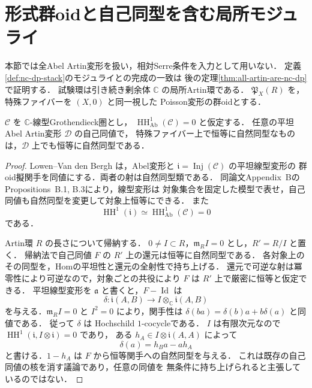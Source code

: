 \section{形式群oidと自己同型を含む局所モジュライ}
\label{sec:formal-groupoid}

本節では全Abel Artin変形を扱い，相対Serre条件を入力として用いない．
定義\ref{def:nc-dp-stack}のモジュライとの完成の一致は
後の定理\ref{thm:all-artin-are-nc-dp}で証明する．
試験環は引き続き剰余体 $\mathbb C$ の局所Artin環である．
$\mathfrak P_X(R)$ を，特殊ファイバーを $(X,0)$ と同一視した
Poisson変形の群oidとする．

\begin{lemma}[微小なAbel自己同値の消滅]
\label{lem:abel-infinitesimal-aut-rigidity}
$\mathcal C$ を $\mathbb C$-線型Grothendieck圏とし，
$\operatorname{HH}^1_{\mathrm{Ab}}(\mathcal C)=0$ と仮定する．
任意の平坦Abel Artin変形 $\mathcal D$ の自己同値で，
特殊ファイバー上で恒等に自然同型なものは，$\mathcal D$ 上でも恒等に自然同型である．
\end{lemma}
\begin{proof}
Lowen--Van den Bergh \cite[Definition~8.2, Theorem~8.17]{LowenVdBDeformation}
は，Abel変形と $\mathfrak i=\operatorname{Inj}(\mathcal C)$ の平坦線型変形の
群oid擬関手を同値にする．両者の射は自然同型類である．
同論文Appendix~BのPropositions~B.1, B.3により，線型変形は
対象集合を固定した模型で表せ，自己同値も自然同型を変更して対象上恒等にできる．
また
\[
 \operatorname{HH}^1(\mathfrak i)
 \simeq\operatorname{HH}^1_{\mathrm{Ab}}(\mathcal C)=0
\]
である\cite[Theorem~6.6]{LowenVdBHochschild}．

Artin環 $R$ の長さについて帰納する．
$0\ne I\subset R$，$\mathfrak m_RI=0$ とし，$R'=R/I$ と置く．
帰納法で自己同値 $F$ の $R'$ 上の還元は恒等に自然同型である．
各対象上のその同型を，Homの平坦性と還元の全射性で持ち上げる．
還元で可逆な射は冪零性により可逆なので，対象ごとの共役により
$F$ は $R'$ 上で厳密に恒等と仮定できる．
平坦線型変形を $\mathfrak a$ と書くと，$F-\operatorname{Id}$ は
\[
 \delta:\mathfrak i(A,B)\longrightarrow I\otimes_{\mathbb C}\mathfrak i(A,B)
\]
を与える．$\mathfrak m_RI=0$ と $I^2=0$ により，関手性は
$\delta(ba)=\delta(b)a+b\delta(a)$ と同値である．
従って $\delta$ は Hochschild $1$-cocycleである．
$I$ は有限次元なので $\operatorname{HH}^1(\mathfrak i,I\otimes\mathfrak i)=0$ であり，
ある $h_A\in I\otimes\mathfrak i(A,A)$ によって
\[
 \delta(a)=h_Ba-ah_A
\]
と書ける．$1-h_A$ は $F$ から恒等関手への自然同型を与える．
これは既存の自己同値の核を消す議論であり，任意の同値を
無条件に持ち上げられると主張しているのではない．
\end{proof}

